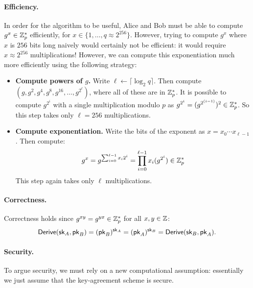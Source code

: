 \paragraph{Efficiency.} In order for the algorithm to be useful,
Alice and Bob must be able to compute $g^x \in \mathbb{Z}^*_p$ efficiently,
for $x \in \{1, \dots, q \approx 2^{256}\}$.
However, trying to compute $g^x$ where $x$ is $256$
bits long naively would certainly not be
efficient: it would require $x \approx 2^{256}$ multiplications!
However, we can compute this exponentiation much more efficiently using
the following strategy:
\begin{itemize}[noitemsep]
  \item \textbf{Compute powers of $g$.}
        Write $\ell \gets \lceil \log_2 q \rceil$.
        Then compute $(g, g^2, g^4, g^{8}, g^{16}, \dots, g^{2^\ell})$,
        where all of these are in $\mathbb{Z}^*_p$.
        It is possible to compute $g^{2^{i}}$ with a single multiplication
        modulo $p$ as $g^{2^i} = (g^{2^{(i-1)}})^2 \in \mathbb{Z}^*_p$.
        So this step takes only $\ell = 256$ multiplications.
  \item \textbf{Compute exponentiation.}
        Write the bits of the exponent as $x = x_0 \cdots x_{\ell-1}$.
        Then compute:
        \[ g^x = g^{\sum_{i = 0}^{\ell-1} x_i 2^i} = \prod_{i=0}^{\ell-1} x_i(g^{2^i}) \in \mathbb{Z}^*_p\] 
        This step again takes only $\ell$ multiplications.
\end{itemize}


\paragraph{Correctness.}
Correctness holds since $g^{xy}=g^{yx} \in \mathbb{Z}^*_p$ for all $x,y \in \mathbb{Z}$:
\begin{align*}
  \mathsf{Derive}({\mathsf{sk}}_A, \mathsf{pk}_B) = (\mathsf{pk}_B)^{{\mathsf{sk}}_A} = (\mathsf{pk}_A)^{{\mathsf{sk}}_B} = \mathsf{Derive}({\mathsf{sk}}_B, \mathsf{pk}_A).
\end{align*}


\paragraph{Security.}
To argue security, we must rely on a new computational assumption:
essentially we just assume that the key-agreement scheme is secure.

